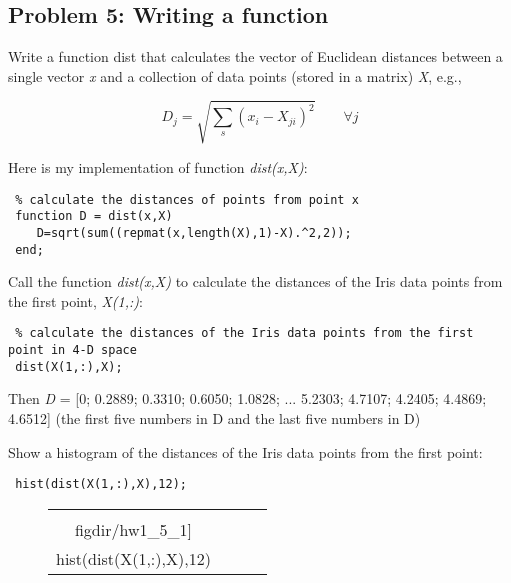\documentclass[twoside,11pt]{article}
\newcommand{\figdir}{fig}
\theoremstyle{definition}
\begin{document}
\subsection*{Problem 5: Writing a function}
Write a function dist that calculates the vector of Euclidean distances between a single vector \textit{x}
and a collection of data points (stored in a matrix) \textit{X}, e.g.,

$$ D_j = \sqrt{\sum\limits_{s}(x_{i}-X_{ji})^2} \qquad \forall j $$

\vspace{3ex}
Here is my implementation of function \textit{dist(x,X)}:
\begin{lstlisting}
 % calculate the distances of points from point x
 function D = dist(x,X)
    D=sqrt(sum((repmat(x,length(X),1)-X).^2,2)); 
 end;
\end{lstlisting}

\vspace{3ex}
Call the function \textit{dist(x,X)} to calculate the distances of the Iris data points from the first point, \textit{X(1,:)}:
\begin{lstlisting}
 % calculate the distances of the Iris data points from the first point in 4-D space
 dist(X(1,:),X);
\end{lstlisting}

Then \textit{D} = [0; 0.2889; 0.3310; 0.6050; 1.0828; ... 5.2303; 4.7107; 4.2405; 4.4869; 4.6512] (the first five numbers in D and the last five numbers in D)

\vspace{3ex}
Show a histogram of the distances of the Iris data points from the first point:
\begin{lstlisting}
 hist(dist(X(1,:),X),12);
\end{lstlisting}

\begin{figure}[h!] \centering
\begin{tabular}{cccc}
\texttt{[image: \\figdir/hw1\_5\_1]} \\ hist(dist(X(1,:),X),12)
\end{tabular}
\end{figure}
\end{document}
